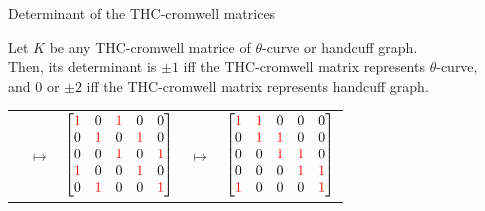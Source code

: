 \begin{frame}{Determinant of the THC-cromwell matrices}
	\begin{thm}
		Let $K$ be any THC-cromwell matrice of $\theta$-curve or handcuff graph. \\
		Then, its determinant is $\pm1$ iff the THC-cromwell matrix represents $\theta$-curve, \\
		and $0$ or $\pm2$ iff the THC-cromwell matrix represents handcuff graph.
	\end{thm}
	\mypf
	\begin{tabu}{X[5c]X[c]X[5c]X[c]X[5c]}
			 &
			$\longmapsto$ &
			$\begin{bmatrix}
				\textcolor{red}{1} & 0 & \textcolor{red}{1} & 0 & 0\\
				0 & \textcolor{red}{1} & 0 & \textcolor{red}{1} & 0\\
				0 & 0 & \textcolor{red}{1} & 0 & \textcolor{red}{1}\\
				\textcolor{red}{1} & 0 & 0 & \textcolor{red}{1} & 0\\
				0 & \textcolor{red}{1} & 0 & 0 & \textcolor{red}{1}
			\end{bmatrix}$&
			$\longmapsto$ &
			$\begin{bmatrix}
				\textcolor{red}{1} & \textcolor{red}{1} & 0 & 0 & 0\\
				0 & \textcolor{red}{1} & \textcolor{red}{1} & 0 & 0\\
				0 & 0 & \textcolor{red}{1} & \textcolor{red}{1} & 0\\
				0 & 0 & 0 & \textcolor{red}{1} & \textcolor{red}{1}\\
				\textcolor{red}{1} & 0 & 0 & 0 & \textcolor{red}{1}
			\end{bmatrix}$
	\end{tabu}
\end{frame}

